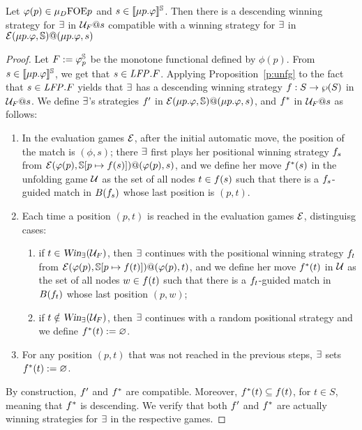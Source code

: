 \begin{proposition}\label{p:unfold=evalgame2}
Let $\varphi(p) \in \mu_{D}\mathrm{FOE}{p}$ and $s \in \llbracket\mu p.\varphi\rrbracket^{\mathbb{S}}$. 
Then there is a descending winning strategy for $\exists$ in $\mathcal{U}_F@s$ 
compatible with a  winning strategy for $\exists$ in 
$\mathcal{E}(\mu p.\varphi,\mathbb{S})@(\mu p.\varphi,s)$
\end{proposition}

\begin{proof}
Let $F \mathrel{:=}  \varphi_{p}^{\mathbb{S}}$ be the monotone functional defined by $\phi(p)$.
From $s \in \llbracket\mu p.\varphi\rrbracket^{\mathbb{S}}$, we get that $s \in \mathit{LFP}. F$.  
Applying Proposition~\ref{p:unfg} to the fact that $s \in \mathit{LFP}. F$ yields that 
$\exists$ has a descending winning strategy $f: S \to \wp{(S)}$ in $\mathcal{U}_{F}@s$. 
We define $\exists$'s strategies $f'$  in
$\mathcal{E}(\mu p.\varphi,\mathbb{S})@(\mu p.\varphi,s)$, and $f^*$ in $\mathcal{U}_{F}@s$ as follows:
\begin{enumerate}
\item 
In the evaluation games $\mathcal{E}$, after the initial automatic move, the position 
of the match is $(\phi,s)$; there $\exists$ first plays her positional winning 
strategy $f_s$ from $\mathcal{E}(\varphi(p),\mathbb{S}[p \mapsto f(s)])@(\varphi(p),
s)$, and we define her move $f^*(s)$ in the unfolding game $\mathcal{U}$ as the 
set of all nodes $t \in f(s)$ such that there is a $f_s$-guided 
match in $B(f_s)$ whose last position is $(p,t)$.
\item 
Each time a position $(p,t)$ is reached in the evaluation games $\mathcal{E}$, 
distinguisg cases:
\begin{enumerate}
\item 
if $t \in \win_{\eloise}(\UG_{F})$, then $\exists$ continues with the positional
winning strategy $f_t$ from $\mathcal{E}(\varphi(p),\mathbb{S}[p \mapsto
f(t)])@(\varphi(p),t)$, and we define her move $f^*(t)$ in $\mathcal{U}$ as the 
set of all nodes $w \in f(t)$ such that there is a $f_t$-guided
match in $B(f_t)$ whose last position $(p,w)$;
\item 
if $t \notin \win_{\eloise}(\UG_{F})$, then $\exists$ continues with a random 
positional strategy and we define $f^*(t)\mathrel{:=} \varnothing$.
\end{enumerate}
\item 
For any position $(p,t)$ that was not reached in the previous steps, $\exists$ 
sets $f^*(t)\mathrel{:=} \varnothing$.
\end{enumerate}
By construction, $f'$ and  $f^*$ are compatible. 
Moreover, $f^*(t) \subseteq f(t)$, for $t \in S$, meaning that 
$f^*$ is descending.
We verify that both $f'$ and  $f^*$ are actually winning strategies
for $\exists$ in the respective games.


\end{proof}
